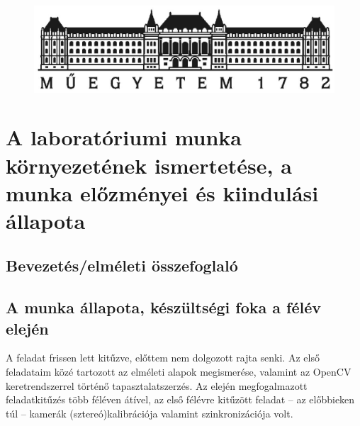 \documentclass[a4paper,oneside]{article}
\begin{document}
\onehalfspacing
\frenchspacing


\begin{titlepage}
 \begin{figure}[h]
    \centering
      \includegraphics[width=12cm]{bme_logo.eps}
  \label{fig:bme_logo}
  \end{figure}
  \thispagestyle{empty}
  \onlabcim

  
 
\end{titlepage} 

\section{A laboratóriumi munka környezetének ismertetése, a munka előzményei és kiindulási állapota}
\label{sec:bevezeto}

\subsection{Bevezetés/elméleti összefoglaló}
\label{sec:bevez-ossz}


\subsection{A munka állapota, készültségi foka a félév elején}
\label{sec:munka-allap-kesz}

A feladat frissen lett kitűzve, előttem nem dolgozott rajta senki. Az első feladataim közé tartozott az elméleti alapok megismerése, valamint az OpenCV keretrendszerrel történő tapasztalatszerzés. Az elején megfogalmazott feladatkitűzés több féléven átível, az első félévre kitűzött feladat -- az előbbieken túl -- kamerák (sztereó)kalibrációja valamint szinkronizációja volt.
\end{document}
